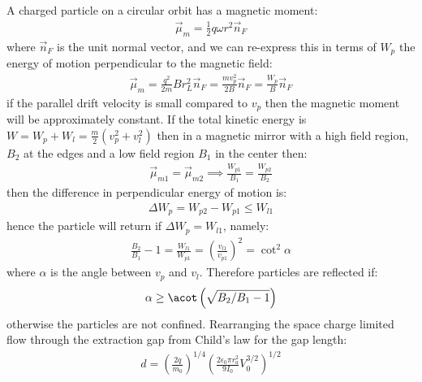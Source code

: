 \documentclass{article}
\numberwithin{equation}{section}
\begin{document}
A charged particle on a circular orbit has a magnetic moment:
\begin{align}
\vec{\mu}_m = \frac{1}{2} q \omega r^2 \vec{n}_F
\end{align}
where $\vec{n}_F$ is the unit normal vector, and we can re-express this in terms of $W_p$ the energy of motion perpendicular to the magnetic field:
\begin{align}
\vec{\mu}_m = \frac{q^2}{2 m} B r_L^2 \vec{n}_F = \frac{m v_p^2}{2B} \vec{n}_F = \frac{W_p}{B} \vec{n}_F
\end{align}
if the parallel drift velocity is small compared to $v_p$ then the magnetic moment will be approximately constant. If the total kinetic energy is $W = W_p + W_l = \frac{m}{2}( v_p^2 + v_l^2 )$ then in a magnetic mirror with a high field region, $B_2$ at the edges and a low field region $B_1$ in the center then:
\begin{align}
\vec{\mu}_{m1} = \vec{\mu}_{m2} \implies \frac{W_{p1}}{B_1} = \frac{W_{p2}}{B_2}
\end{align}
then the difference in perpendicular energy of motion is:
\begin{align}
\Delta W_p = W_{p2} - W_{p1} \leq W_{l1}
\end{align}
hence the particle will return if $\Delta W_p = W_{l1}$, namely:
\begin{align}
\frac{B_2}{B_1} - 1 = \frac{W_{l1}}{W_{p1}} = \left( \frac{v_{l1}}{ v_{p1} } \right)^2 = \cot^2 \alpha
\end{align}
where $\alpha$ is the angle between $v_p$ and $v_l$. Therefore particles are reflected if:
\begin{align}
\alpha \geq \acot \left( \sqrt{B_2/B_1 -1 }\right)
\end{align}
otherwise the particles are not confined. Rearranging the space charge limited flow through the extraction gap from Child's law for the gap length:
\begin{align}
d = \left( \frac{2 q}{m_0} \right)^{1/4} \left( \frac{2 \epsilon_0 \pi r_a^2}{9 I_0} V_0^{3/2} \right)^{1/2}
\end{align}
\end{document}
